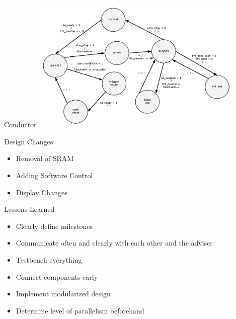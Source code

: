 \documentclass{beamer}
\begin{document}
\begin{frame}{Conductor}
	\centering
    \includegraphics[width=4in]{conductor_state}
\end{frame}

\begin{frame}{Design Changes}
	\begin{itemize}
		\item Removal of SRAM
		\item Adding Software Control
		\item Display Changes
	\end{itemize}
\end{frame}

\begin{frame}{Lessons Learned}
	\begin{itemize}
		\item Clearly define milestones
		\item Communicate often and clearly with each other and the adviser
		\item Testbench everything
		\item Connect components early
		\item Implement modularized design
		\item Determine level of parallelism beforehand
	\end{itemize}
\end{frame}
\end{document}
